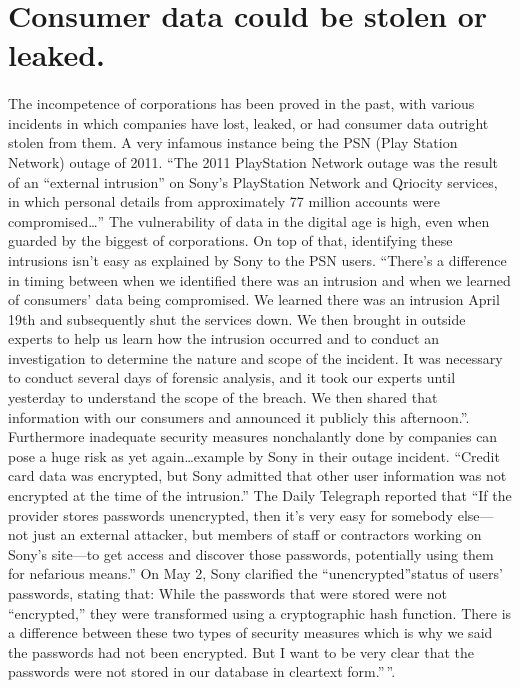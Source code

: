 \section{Consumer data could be stolen or leaked.}
\paragraph{}
The incompetence of corporations has been proved in the past, with various
incidents in which companies have lost, leaked, or had consumer data outright stolen
from them. A very infamous instance being the PSN (Play Station Network) outage
of 2011. ``The 2011 PlayStation Network outage was the result of an ``external
intrusion'' on Sony's PlayStation Network and Qriocity services, in which
personal details from approximately 77 million accounts were compromised\ldots{}''
\cite{sonypr2011}\cite{bbc2011}\cite{shanerichmond2011}\cite{chrisgriffith2011}
The vulnerability of data in the digital age is high, even when guarded by the
biggest of corporations. On top of that, identifying these intrusions isn't easy
as explained by Sony to the PSN users. ``There’s a difference in timing between
when we identified there was an intrusion and when we learned of consumers’ data
being compromised. We learned there was an intrusion April 19th and subsequently
shut the services down. We then brought in outside experts to help us learn how
the intrusion occurred and to conduct an investigation to determine the nature
and scope of the incident. It was necessary to conduct several days of forensic
analysis, and it took our experts until yesterday to understand the scope of the
breach. We then shared that information with our consumers and announced it
publicly this afternoon.''\cite{patrickseybold2011}. Furthermore inadequate
security measures nonchalantly done by companies can pose a huge risk as yet
again\ldots{}example by Sony in their outage incident. ``Credit card data was
encrypted, but Sony admitted that other user information was not encrypted at
the time of the intrusion.''\cite{sonyqa2011}
\cite{keithstuartcharlesarthur2011} The Daily Telegraph reported that ``If the
provider stores passwords unencrypted, then it's very easy for somebody else---
not just an external attacker, but members of staff or contractors working on
Sony's site---to get access and discover those passwords, potentially using
them for nefarious means.''\cite{christopherwilliams2011} On May 2, Sony
clarified the ``unencrypted''status of users' passwords, stating that:
\cite{patrickseybold20113}
While the passwords that were stored were not ``encrypted,'' they were
transformed using a cryptographic hash function. There is a difference between
these two types of security measures which is why we said the passwords had not
been encrypted. But I want to be very clear that the passwords were not stored
in our database in cleartext form.''\,''.
\par

